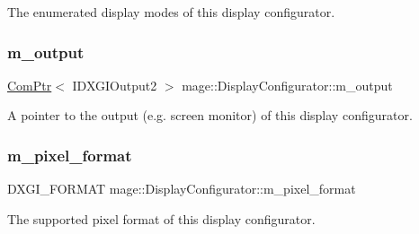 The enumerated display modes of this display configurator. \hypertarget{classmage_1_1_display_configurator_a181e657b9ce888d3580c9fdbb50898e2}{}\label{classmage_1_1_display_configurator_a181e657b9ce888d3580c9fdbb50898e2} 
\subsubsection{\texorpdfstring{m\+\_\+output}{m\_output}}
{\footnotesize\ttfamily \hyperlink{namespacemage_ae74f374780900893caa5555d1031fd79}{Com\+Ptr}$<$ I\+D\+X\+G\+I\+Output2 $>$ mage\+::\+Display\+Configurator\+::m\+\_\+output\hspace{0.3cm}{\ttfamily [private]}}

A pointer to the output (e.\+g. screen monitor) of this display configurator. \hypertarget{classmage_1_1_display_configurator_a22998ef4e54c3da0118a734164792b8f}{}\label{classmage_1_1_display_configurator_a22998ef4e54c3da0118a734164792b8f} 
\subsubsection{\texorpdfstring{m\+\_\+pixel\+\_\+format}{m\_pixel\_format}}
{\footnotesize\ttfamily D\+X\+G\+I\+\_\+\+F\+O\+R\+M\+AT mage\+::\+Display\+Configurator\+::m\+\_\+pixel\+\_\+format\hspace{0.3cm}{\ttfamily [private]}}

The supported pixel format of this display configurator. 